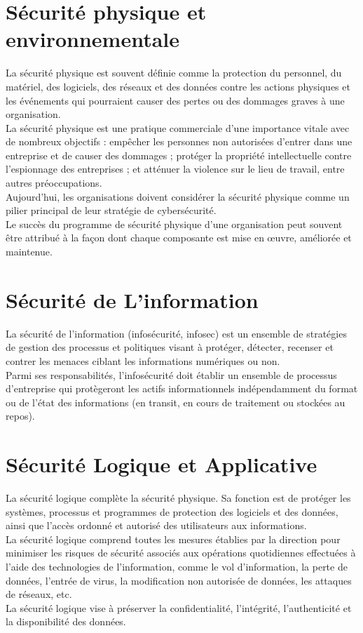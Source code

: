 \section*{Sécurité physique et environnementale }
La sécurité physique est souvent définie comme la protection du personnel, du matériel, des logiciels, des réseaux et des données contre les actions physiques et les événements qui pourraient causer des pertes ou des dommages graves à une organisation.\\
La sécurité physique est une pratique commerciale d'une importance vitale avec de nombreux objectifs : empêcher les personnes non autorisées d'entrer dans une entreprise et de causer des dommages ; protéger la propriété intellectuelle contre l'espionnage des entreprises ; et atténuer la violence sur le lieu de travail, entre autres préoccupations.\\
 Aujourd'hui, les organisations doivent considérer la sécurité physique comme un pilier principal de leur stratégie de cybersécurité.\\
 Le succès du programme de sécurité physique d'une organisation peut souvent être attribué à la façon dont chaque composante est mise en œuvre, améliorée et maintenue.\\

\section*{Sécurité de L'information} 
 La sécurité de l'information (infosécurité, infosec) est un ensemble de stratégies de gestion des processus et politiques visant à protéger, détecter, recenser et contrer les menaces ciblant les informations numériques ou non.\\
 Parmi ses responsabilités, l'infosécurité doit établir un ensemble de processus d'entreprise qui protègeront les actifs informationnels indépendamment du format ou de l'état des informations (en transit, en cours de traitement ou stockées au repos).\\
 
 \section*{Sécurité Logique et Applicative}
 La sécurité logique complète la sécurité physique. Sa fonction est de protéger les systèmes, processus et programmes de protection des logiciels et des données, ainsi que l’accès ordonné et autorisé des utilisateurs aux informations.\\
  La sécurité logique comprend toutes les mesures établies par la direction pour minimiser les risques de sécurité associés aux opérations quotidiennes effectuées à l’aide des technologies de l’information, comme le vol d’information, la perte de données, l’entrée de virus, la modification non autorisée de données, les attaques de réseaux, etc.\\
   La sécurité logique vise à préserver la confidentialité, l’intégrité, l’authenticité et la disponibilité des données.\\
 

